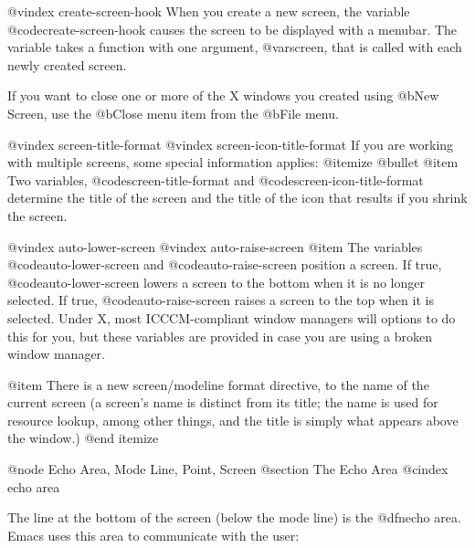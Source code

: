 @vindex create-screen-hook
When you create a new screen, the variable @code{create-screen-hook}
causes the screen to be displayed with a menubar. The variable takes a
function with one argument, @var{screen}, that is called with each newly
created screen.

If you want to close one or more of the X windows you created using
@b{New Screen}, use the @b{Close} menu item from the @b{File} menu.  

@vindex screen-title-format
@vindex screen-icon-title-format
If you are working with multiple screens, some special information
applies:
@itemize @bullet
@item Two variables, @code{screen-title-format} and
@code{screen-icon-title-format} determine the title of the screen and the
title of the icon that results if you shrink the screen. 

@vindex auto-lower-screen
@vindex auto-raise-screen
@item The variables @code{auto-lower-screen} and
@code{auto-raise-screen} position a screen. If true,
@code{auto-lower-screen} lowers a screen to the bottom when it is no longer
selected. If true, @code{auto-raise-screen} raises a screen to
the top when it is selected. Under X, most ICCCM-compliant window managers
will options to do this for you, but these variables are provided in
case you are using a broken window manager.

@item There is a new screen/modeline format directive, %
to the name of the current screen (a screen's name is distinct from its
title; the name is used for resource lookup, among other things, and the
title is simply what appears above the window.)
@end itemize


@node Echo Area, Mode Line, Point, Screen
@section The Echo Area
@cindex echo area

  The line at the bottom of the screen (below the mode line) is the
@dfn{echo area}.  Emacs uses this area to communicate with the user:

